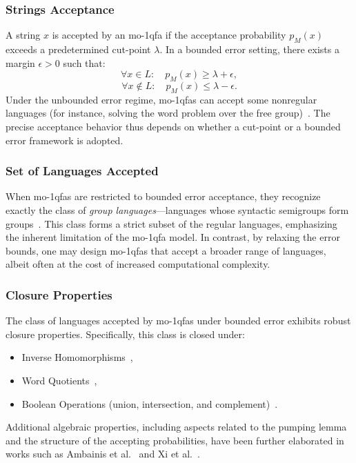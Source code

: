 \subsubsection{Strings Acceptance}
A string $x$ is accepted by an \gls{mo-1qfa} if the acceptance probability $p_M(x)$ exceeds a predetermined cut-point $\lambda$. In a bounded error setting, there exists a margin $\epsilon > 0$ such that:
\[
\forall x\in L:\quad p_M(x) \ge \lambda + \epsilon,
\]
\[
\forall x\notin L:\quad p_M(x) \le \lambda - \epsilon.
\]
Under the unbounded error regime, \gls{mo-1qfa}s can accept some nonregular languages (for instance, solving the word problem over the free group)~\cite{brodsky2002characterizations}. The precise acceptance behavior thus depends on whether a cut-point or a bounded error framework is adopted.

\subsubsection{Set of Languages Accepted}
When \gls{mo-1qfa}s are restricted to bounded error acceptance, they recognize exactly the class of \emph{group languages}—languages whose syntactic semigroups form groups~\cite{brodsky2002characterizations}. This class forms a strict subset of the regular languages, emphasizing the inherent limitation of the \gls{mo-1qfa} model. In contrast, by relaxing the error bounds, one may design \gls{mo-1qfa}s that accept a broader range of languages, albeit often at the cost of increased computational complexity.

\subsubsection{Closure Properties}
The class of languages accepted by \gls{mo-1qfa}s under bounded error exhibits robust closure properties. Specifically, this class is closed under:
\begin{itemize}
    \item Inverse Homomorphisms~\cite{brodsky2002characterizations},
    \item Word Quotients~\cite{brodsky2002characterizations},
    \item Boolean Operations (union, intersection, and complement)~\cite{10.1007/11605157_1,10.1007/3-540-45007-6_1}.
\end{itemize}
Additional algebraic properties, including aspects related to the pumping lemma and the structure of the accepting probabilities, have been further elaborated in works such as Ambainis et al.~\cite{ambainis1999probabilities} and Xi et al.~\cite{Xi2008}.

